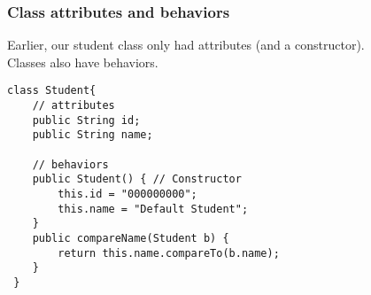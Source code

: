 \documentclass[aspectratio=169]{beamer}
\begin{document}
\begin{frame}[fragile]
\frametitle{Class attributes and behaviors}
Earlier, our student class only had attributes (and a constructor).\\
Classes also have behaviors.
\begin{example}
\begin{lstlisting}
class Student{
    // attributes
    public String id;
    public String name;

    // behaviors
    public Student() { // Constructor
        this.id = "000000000";
        this.name = "Default Student";
    }
    public compareName(Student b) {
        return this.name.compareTo(b.name);
    }
 }
\end{lstlisting}
\end{example}
\end{frame}
\end{document}
